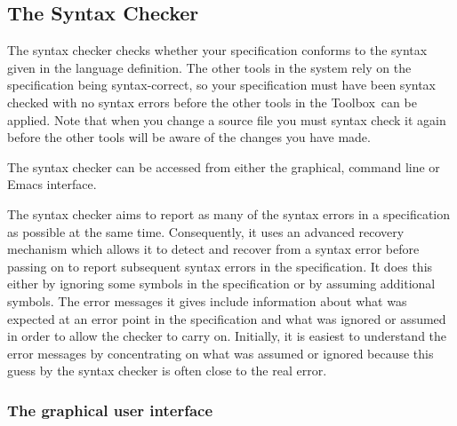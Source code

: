 \documentclass[\pformat,12pt]{article}
\newcommand{\Toolbox}{Toolbox}
\begin{document}
\newpage
\subsection{The Syntax Checker}\label{sec:parser}

The syntax checker checks whether your specification conforms to the
syntax given in the language definition. The other tools in the system
rely on the specification being syntax-correct, so your
specification must have been syntax checked with no syntax errors
before the other tools in the \Toolbox\ can be applied. Note that when you
change a source file you must syntax check it again before the other
tools will be aware of the changes you have made.

The syntax checker can be accessed from either the graphical, command
line or Emacs interface.

The syntax checker aims to report as many of the syntax errors in a
specification as possible at the same time. Consequently, it uses an
advanced recovery mechanism which allows it to detect and recover from
a syntax error before passing on to report subsequent syntax errors in
the specification. It does this either by ignoring some symbols in the 
specification or by assuming additional symbols. The error messages it
gives 
include information about what was expected at an error point in the
specification and what was ignored or assumed in order to allow the
checker to carry on. Initially, it is easiest to understand the error
messages by concentrating on what was assumed or ignored because this
guess by the syntax checker is often close to the real error.


\subsubsection{The graphical user interface}
\end{document}
